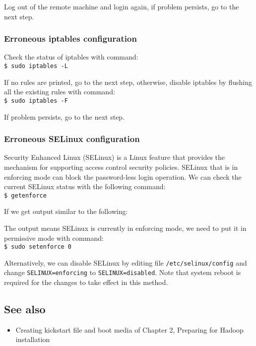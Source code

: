 Log out of the remote machine and login again, if problem persists, go to the next step. 
\subsubsection*{Erroneous iptables configuration}
Check the status of iptables with command: \\
\verb|$ sudo iptables -L|

If no rules are printed, go to the next step, otherwise, disable iptables by flushing all the existing rules with command: \\
\verb|$ sudo iptables -F|

If problem persists, go to the next step.
\subsubsection*{Erroneous SELinux configuration}
Security Enhanced Linux (SELinux) is a Linux feature that provides the mechanism for supporting access control security policies. SELinux that is in enforcing mode can block the password-less login operation. We can check the current SELinux status with the following command: \\
\verb|$ getenforce|

If we get output similar to the following: \\

The output means SELinux is currently in enforcing mode, we need to put it in permissive mode with command: \\
\verb|$ sudo setenforce 0|

Alternatively, we can disable SELinux by editing file \verb|/etc/selinux/config| and change \verb|SELINUX=enforcing| to \verb|SELINUX=disabled|. Note that system reboot is required for the changes to take effect in this method.

\subsection*{See also}
\begin{itemize}
  \item Creating kickstart file and boot media of Chapter 2, Preparing for Hadoop installation
\end{itemize}
